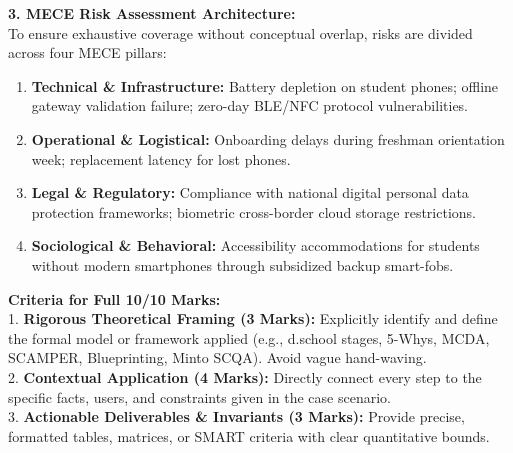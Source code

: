 \begin{solbox}
\textbf{3. MECE Risk Assessment Architecture:}\\
To ensure exhaustive coverage without conceptual overlap, risks are divided across four MECE pillars:
\begin{enumerate}[label=(\roman*)]
    \item \textbf{Technical \& Infrastructure:} Battery depletion on student phones; offline gateway validation failure; zero-day BLE/NFC protocol vulnerabilities.
    \item \textbf{Operational \& Logistical:} Onboarding delays during freshman orientation week; replacement latency for lost phones.
    \item \textbf{Legal \& Regulatory:} Compliance with national digital personal data protection frameworks; biometric cross-border cloud storage restrictions.
    \item \textbf{Sociological \& Behavioral:} Accessibility accommodations for students without modern smartphones through subsidized backup smart-fobs.
\end{enumerate}
\end{solbox}

\begin{examinertip}
\textbf{Criteria for Full 10/10 Marks:}\\
1. \textbf{Rigorous Theoretical Framing (3 Marks):} Explicitly identify and define the formal model or framework applied (e.g., d.school stages, 5-Whys, MCDA, SCAMPER, Blueprinting, Minto SCQA). Avoid vague hand-waving.\\
2. \textbf{Contextual Application (4 Marks):} Directly connect every step to the specific facts, users, and constraints given in the case scenario.\\
3. \textbf{Actionable Deliverables \& Invariants (3 Marks):} Provide precise, formatted tables, matrices, or SMART criteria with clear quantitative bounds.
\end{examinertip}
